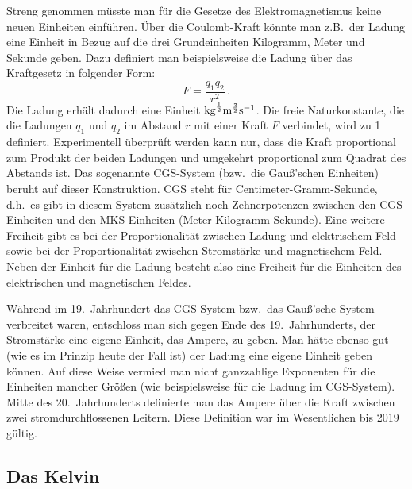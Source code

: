 Streng genommen m\"usste man f\"ur die Gesetze des Elektromagnetismus keine neuen
Einheiten einf\"uhren. \"Uber die Coulomb-Kraft k\"onnte man z.B.\ der Ladung eine Einheit
in Bezug auf die drei Grundeinheiten Kilogramm, Meter und Sekunde geben. Dazu definiert man
beispielsweise die Ladung \"uber das Kraftgesetz in folgender Form:
\begin{equation}
                 F = \frac{q_1 q_2}{r^2}  \, .
\end{equation}
Die Ladung erh\"alt dadurch eine Einheit ${\rm kg}^{\frac{1}{2}} {\rm m}^{\frac{3}{2}} {\rm s}^{-1}$. 
Die freie Naturkonstante, die die Ladungen $q_1$ und $q_2$ im Abstand $r$ mit einer Kraft $F$ verbindet,
wird zu 1 definiert. Experimentell \"uberpr\"uft werden kann nur, dass die Kraft proportional zum Produkt
der beiden Ladungen und umgekehrt proportional zum Quadrat des Abstands ist. 
Das sogenannte CGS-System
(bzw.\ die Gau\ss'schen Einheiten) beruht auf dieser Konstruktion. CGS steht f\"ur Centimeter-Gramm-Sekunde,
d.h.\ es gibt in diesem System zus\"atzlich noch Zehnerpotenzen zwischen den CGS-Einheiten und den 
MKS-Einheiten (Meter-Kilogramm-Sekunde). Eine weitere Freiheit gibt es bei der Proportionalit\"at zwischen 
Ladung und elektrischem Feld sowie bei der Proportionalit\"at zwischen Stromst\"arke und magnetischem
Feld. Neben der Einheit f\"ur die Ladung besteht also eine Freiheit f\"ur die Einheiten des elektrischen und
magnetischen Feldes. 

W\"ahrend im 19.\ Jahrhundert das CGS-System bzw.\ das Gau\ss'sche System verbreitet waren, entschloss
man sich gegen Ende des 19.\ Jahrhunderts, der Stromst\"arke eine eigene Einheit, das Ampere, 
zu geben.
Man h\"atte ebenso gut (wie es im Prinzip heute der Fall ist) der Ladung eine eigene Einheit geben k\"onnen.  
Auf diese Weise vermied man nicht ganzzahlige Exponenten f\"ur die Einheiten mancher Gr\"o\ss en (wie
beispielsweise f\"ur die Ladung im CGS-System). Mitte des 20.\ Jahrhunderts definierte man das Ampere
\"uber die Kraft zwischen zwei stromdurchflossenen Leitern. Diese Definition war im Wesentlichen bis
2019 g\"ultig.  

\subsection{Das Kelvin}

